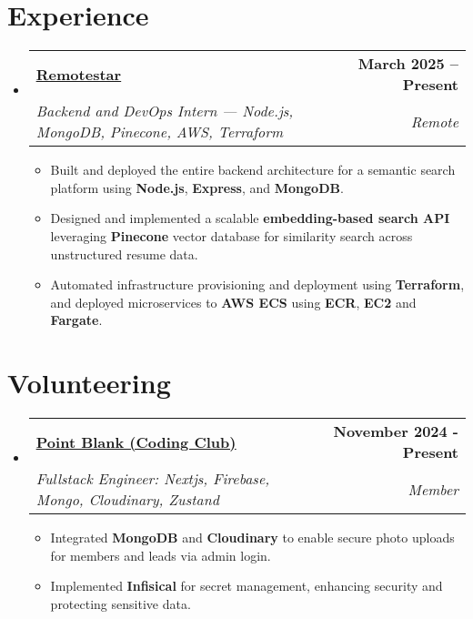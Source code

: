 \documentclass[a4paper,11pt]{article}
\makeatletter
\newcommand{\resumeSubheading}[4]{
  \vspace{-2pt}\item
    \begin{tabular*}{1.0\textwidth}[t]{l@{\extracolsep{\fill}}r}
      \textbf{#1} & \textbf{\small #2} \\
      \textit{\small#3} & \textit{\small #4} \\
    \end{tabular*}\vspace{-7pt}
}
\newcommand{\resumeSubHeadingListStart}{\begin{itemize}[leftmargin=0.0in, label={}]}
\newcommand{\resumeSubHeadingListEnd}{\end{itemize}}
\newcommand{\resumeItemListStart}{\begin{itemize}}
\newcommand{\resumeItemListEnd}{\end{itemize}\vspace{-5pt}}
\makeatother
\begin{document}
\section{Experience}
\resumeSubHeadingListStart
\resumeSubheading
{\href{https://www.remotestar.io/}{\underline{Remotestar}}}{March 2025 – Present}
{Backend and DevOps Intern — Node.js, MongoDB, Pinecone, AWS, Terraform}{Remote}
\resumeItemListStart
  \item Built and deployed the entire backend architecture for a semantic search platform using \textbf{Node.js}, \textbf{Express}, and \textbf{MongoDB}.
  \item Designed and implemented a scalable \textbf{embedding-based search API} leveraging \textbf{Pinecone} vector database for similarity search across unstructured resume data.
  \item Automated infrastructure provisioning and deployment using \textbf{Terraform}, and deployed microservices to \textbf{AWS ECS} using \textbf{ECR}, \textbf{EC2} and \textbf{Fargate}.
\resumeItemListEnd

\vspace{-4pt}

\resumeSubHeadingListEnd

\vspace{-10pt}

\section{Volunteering}
\resumeSubHeadingListStart
  \resumeSubheading
{\href{https://www.pointblank.club/}{\underline{Point Blank (Coding Club)}}}{November 2024 - Present}
  {Fullstack Engineer: Nextjs, Firebase, Mongo, Cloudinary, Zustand}{Member}
  \resumeItemListStart
  \item Integrated \textbf{MongoDB} and \textbf{Cloudinary} to enable secure photo uploads for members and leads via admin login.
  \item Implemented \textbf{Infisical} for secret management, enhancing security and protecting sensitive data. 
  \resumeItemListEnd
  \vspace{-4pt}
\resumeSubHeadingListEnd

\vspace{-10pt}
\end{document}
